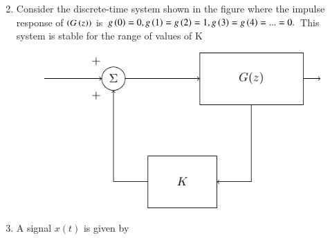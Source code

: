 \documentclass[journal]{IEEEtran}
\begin{document}
\begin{enumerate}
\begin{enumerate}
\begin{multicols}{2}
				\end{multicols}
		\end{enumerate}
	\item Consider the discrete-time system shown in the figure where the impulse response of $\left(G\left(z\right)\right)$ is $g\left(0\right)=0, g\left(1\right)=g\left(2\right)=1, g\left(3\right)=g\left(4\right)=...=0.$ This system is stable for the range of values of K
\begin{figure}[H]
			\centering
			\includegraphics[scale=0.75]{figs/fig36.png}
			\label{stemplot}
		\end{figure}

		\begin{enumerate}
		\end{enumerate}
	\item A signal $x(t)$ is given by


\end{enumerate}
\end{document}
